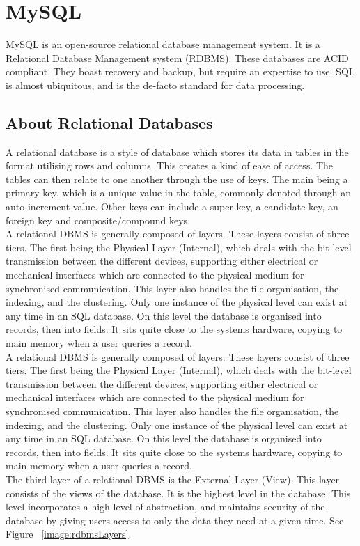 \section{MySQL}
MySQL is an open-source relational database management system. It is a Relational Database Management system (RDBMS). These databases are ACID compliant. They boast recovery and backup, but require an expertise to use. SQL is almost ubiquitous, and is the de-facto standard for data processing. 

\subsection{About Relational Databases}
\label{rdbms}
A relational database is a style of database which stores its data in tables in the format utilising rows and columns. This creates a kind of ease of access. The tables can then relate to one another through the use of keys. The main being a primary key, which is a unique value in the table, commonly denoted through an auto-increment value. Other keys can include a super key, a candidate key, an foreign key and composite/compound keys. 
\\A relational DBMS is generally composed of layers. These layers consist of three tiers. The first being the Physical Layer (Internal), which deals with the bit-level transmission between the different devices, supporting either electrical or mechanical interfaces which are connected to the physical medium for synchronised communication. This layer also handles the file organisation, the indexing, and the clustering. Only one instance of the physical level can exist at any time in an SQL database. On this level the database is organised into records, then into fields. It sits quite close to the systems hardware, copying to main memory when a user queries a record.
\\A relational DBMS is generally composed of layers. These layers consist of three tiers. The first being the Physical Layer (Internal), which deals with the bit-level transmission between the different devices, supporting either electrical or mechanical interfaces which are connected to the physical medium for synchronised communication. This layer also handles the file organisation, the indexing, and the clustering. Only one instance of the physical level can exist at any time in an SQL database. On this level the database is organised into records, then into fields. It sits quite close to the systems hardware, copying to main memory when a user queries a record.
\\The third layer of a relational DBMS is the External Layer (View). This layer consists of the views of the database. It is the highest level in the database. This level incorporates a high level of abstraction, and maintains security of the database by giving users access to only the data they need at a given time.
See Figure ~\ref{image:rdbmsLayers}.

